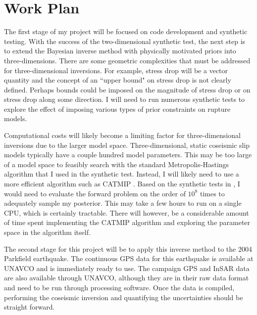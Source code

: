 \documentclass[12pt]{article}
\begin{document}
\section*{Work Plan}
The first stage of my project will be focused on code development and synthetic testing.  With the success of the two-dimensional synthetic test, the next step is to extend the Bayesian inverse method with physically motivated priors into three-dimensions.  There are some geometric complexities that must be addressed for three-dimensional inversions.  For example, stress drop will be a vector quantity and the concept of an ``upper bound" on stress drop is not clearly defined.  Perhaps bounds could be imposed on the magnitude of stress drop or on stress drop along some direction.  I will need to run numerous synthetic tests to explore the effect of imposing various types of prior constraints on rupture models.  

Computational costs will likely become a limiting factor for three-dimensional inversions due to the larger model space.  Three-dimensional, static coseismic slip models typically have a couple hundred model parameters.  This may be too large of a model space to feasibly search with the standard Metropolis-Hastings algorithm that I used in the synthetic test.  Instead, I will likely need to use a more efficient algorithm such as CATMIP \citep{Minson2013}.  Based on the synthetic tests in \citep{Minson2013}, I would need to evaluate the forward problem on the order of $10^{8}$ times to adequately sample my posterior.  This may take a few hours to run on a single CPU, which is certainly tractable.  There will however, be a considerable amount of time spent implementing the CATMIP algorithm and exploring the parameter space in the algorithm itself.  

The second stage for this project will be to apply this inverse method to the 2004 Parkfield earthquake.  The continuous GPS data for this earthquake is available at UNAVCO and is immediately ready to use.  The campaign GPS and InSAR data are also available through UNAVCO, although they are in their raw data format and need to be run through processing software. Once the data is compiled, performing the coseismic inversion and quantifying the uncertainties should be straight forward.        
\end{document}
